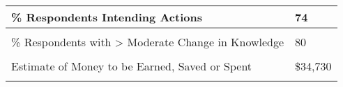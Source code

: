 \documentclass[
]{article}
\begin{document}
\begin{longtable}[t]{ll}
\midrule
\% Respondents Intending Actions & 74\\
\midrule
\cellcolor{gray!10}{\% Respondents with > Moderate Change in Awareness} & \cellcolor{gray!10}{78}\\
\midrule
\% Respondents with > Moderate Change in Knowledge & 80\\
\midrule
\addlinespace
\cellcolor{gray!10}{Total Mileage Equivalent for Travel to a Comparable Seminar} & \cellcolor{gray!10}{10,207}\\
\midrule
Estimate of Money to be Earned, Saved or Spent & \$34,730\\
\midrule
\cellcolor{gray!10}{Number of CEU Requests} & \cellcolor{gray!10}{117}\\
\midrule
\bottomrule
\end{longtable}
\end{document}
